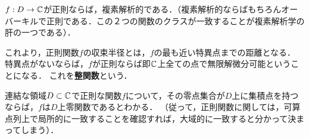\documentclass[uplatex, dvipdfmx]{jsreport}
\begin{document}
\begin{theorem}[正則関数は解析的である]
    $f:D\to\mathbb{C}$が正則ならば，複素解析的である．（複素解析的ならばもちろんオーバーキルで正則である．この２つの関数のクラスが一致することが複素解析学の肝の一つである）．
\end{theorem}
\begin{definition}
    これより，正則関数$f$の収束半径とは，$f$の最も近い特異点までの距離となる．
    特異点がないならば，$f$が正則ならば即$\mathbb{C}$上全ての点で無限解微分可能ということになる．
    これを\textbf{整関数}という．
\end{definition}
\begin{corollary}
    連結な領域$D\subset\mathbb{C}$で正則な関数$f$について，その零点集合が$D$上に集積点を持つならば，$f$は$D$上零関数であるとわかる．
    （従って，正則関数に関しては，可算点列上で局所的に一致することを確認すれば，大域的に一致すると分かって決まってしまう）．
\end{corollary}
\end{document}

